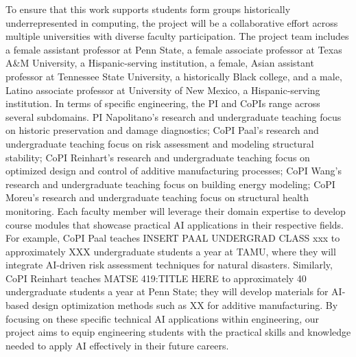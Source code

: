 \documentclass[11pt]{article}
\begin{document}
To ensure that this work supports students form groups historically underrepresented in computing, the project will be a collaborative effort across multiple universities with diverse faculty participation.
The project team includes a female assistant professor at Penn State, a female associate professor at Texas A\&M University, a Hispanic-serving institution, a female, Asian assistant professor at Tennessee State University, a historically Black college, and a male, Latino associate professor at University of New Mexico, a Hispanic-serving institution. 
In terms of specific engineering, the PI and CoPIs range across several subdomains. PI Napolitano's research and undergraduate teaching focus on historic preservation and damage diagnostics; CoPI Paal's research and undergraduate teaching focus on risk assessment and modeling structural stability; CoPI Reinhart's research and undergraduate teaching focus on optimized design and control of additive manufacturing processes; CoPI Wang's research and undergraduate teaching focus on building energy modeling; CoPI Moreu's research and undergraduate teaching focus on structural health monitoring. 
Each faculty member will leverage their domain expertise to develop course modules that showcase practical AI applications in their respective fields. 
For example, CoPI Paal teaches INSERT PAAL UNDERGRAD CLASS xxx to approximately XXX undergraduate students a year at TAMU, where they will integrate AI-driven risk assessment techniques for natural disasters. 
Similarly, CoPI Reinhart teaches MATSE 419:TITLE HERE to approximately 40 undergraduate students a year at Penn State; they will develop materials for AI-based design optimization methods such as  XX for additive manufacturing.
By focusing on these specific technical AI applications within engineering, our project aims to equip engineering students with the practical skills and knowledge needed to apply AI effectively in their future careers.


\end{document}
